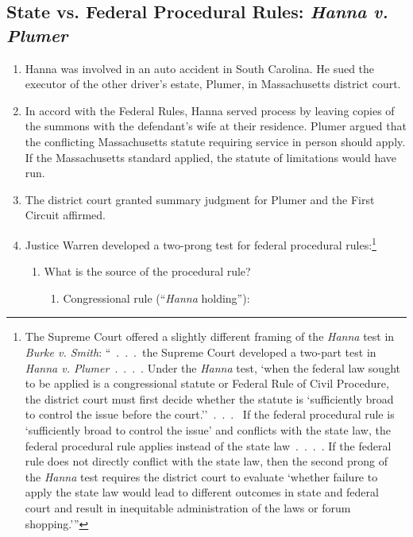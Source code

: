 \subsection{State vs. Federal Procedural Rules: \emph{Hanna v. Plumer}}

\begin{enumerate}
    \item Hanna was involved in an auto accident in South Carolina. He sued 
    the executor of the other driver's estate, Plumer, in Massachusetts 
    district court.
    \item In accord with the Federal Rules, Hanna served process by leaving 
    copies of the summons with the defendant's wife at their residence. Plumer 
    argued that the conflicting Massachusetts statute requiring service in 
    person should apply. If the Massachusetts standard applied, the statute of 
    limitations would have run.
    \item The district court granted summary judgment for Plumer and the First 
    Circuit affirmed.
    \item Justice Warren developed a two-prong test for federal procedural 
    rules:\footnote{The Supreme Court offered a slightly different framing of 
    the \emph{Hanna} test in \emph{Burke v. Smith}:
    \enquote{~.~.~.~the Supreme Court developed a two-part test in \emph{Hanna v.  
    Plumer}~.~.~.~. Under the \emph{Hanna} test, \enquote{when the federal law 
    sought to be applied is a congressional statute or Federal Rule of Civil 
    Procedure, the district court must first decide whether the statute is 
    `sufficiently broad to control the issue before the court.'}~.~.~.~  
    If the federal procedural rule is \enquote{sufficiently broad to control 
    the issue} and conflicts with the state law, the federal procedural rule 
    applies instead of the state law~.~.~.~. If the federal rule does not directly 
    conflict with the state law, then the second prong of the \emph{Hanna} 
    test requires the district court to evaluate \enquote{whether failure to 
    apply the state law would lead to different outcomes in state and federal 
    court and result in inequitable administration of the laws or forum 
    shopping.}}}
    \begin{enumerate}
        \item What is the source of the procedural rule?
        \begin{enumerate}
            \item Congressional rule (``\emph{Hanna} holding''):

\end{enumerate}
\end{enumerate}
\end{enumerate}
